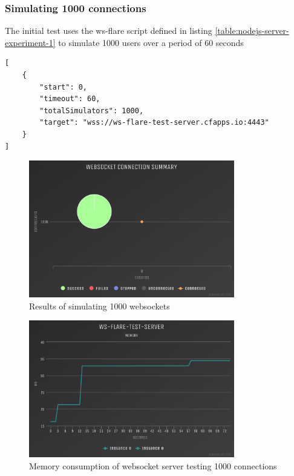 \subsubsection{Simulating 1000 connections}
The initial test uses the ws-flare script defined in listing \ref{table:nodejs-server-experiment-1} to simulate 1000 users over a period of 60 seconds

\begin{listing}[H]
    \caption{WS-Flare test script for 1000 users}
    \label{table:nodejs-server-experiment-1}
    \begin{verbatim}
[
    {
        "start": 0,
        "timeout": 60,
        "totalSimulators": 1000,
        "target": "wss://ws-flare-test-server.cfapps.io:4443"
    }
]
\end{verbatim}
\end{listing}

\begin{figure}[H]
  \centering
    \includegraphics[width=0.8\textwidth]{figures/experiments/experiment-1/node-js/conn-summary-1000.png}
    \caption{Results of simulating 1000 websockets}
    \label{fig:experiment-1-node-conn-summary-1000}
\end{figure}

\begin{figure}[H]
  \centering
    \includegraphics[width=0.8\textwidth]{figures/experiments/experiment-1/node-js/memory-1000.png}
    \caption{Memory consumption of websocket server testing 1000 connections}
    \label{fig:experiment-1-node-memory-1000}
\end{figure}

